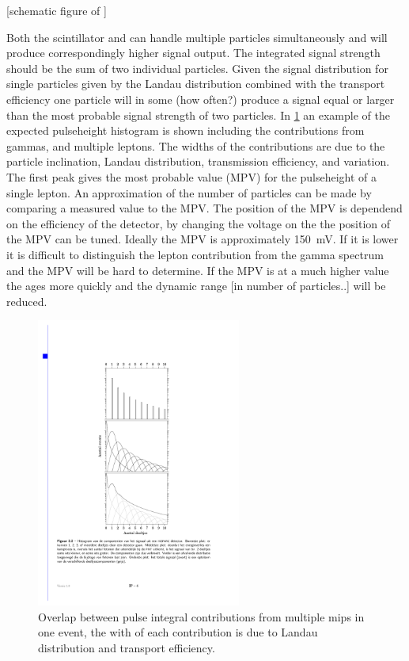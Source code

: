 [schematic figure of \pmt]

Both the scintillator and \pmt can handle multiple particles simultaneously and will produce correspondingly higher signal output. The integrated signal strength should be the sum of two individual particles. Given the signal distribution for single particles given by the Landau distribution combined with the transport efficiency one particle will in some (how often?) produce a signal equal or larger than the most probable signal strength of two particles. In \cref{fig:ph_histogram_contrib} an example of the expected pulseheight histogram is shown including the contributions from gammas, and multiple leptons. The widths of the contributions are due to the particle inclination, Landau distribution, transmission efficiency, and \pmt variation. The first peak gives the most probable value (MPV) for the pulseheight of a single lepton. An approximation of the number of particles can be made by comparing a measured value to the MPV. The position of the MPV is dependend on the efficiency of the detector, by changing the voltage on the \pmt the position of the MPV can be tuned. Ideally the MPV is approximately \SI{150}{\mV}. If it is lower it is difficult to distinguish the lepton contribution from the gamma spectrum and the MPV will be hard to determine. If the MPV is at a much higher value the \pmt ages more quickly and the dynamic range [in number of particles..] will be reduced.

\begin{figure}
    \centering
    \includegraphics[width=0.6\textwidth]
                    {plots/experiment/ph_histogram_contrib}
    \caption{Overlap between pulse integral contributions from multiple mips in one event, the with of each contribution is due to Landau distribution and transport efficiency.}
    \label{fig:ph_histogram_contrib}
\end{figure}

